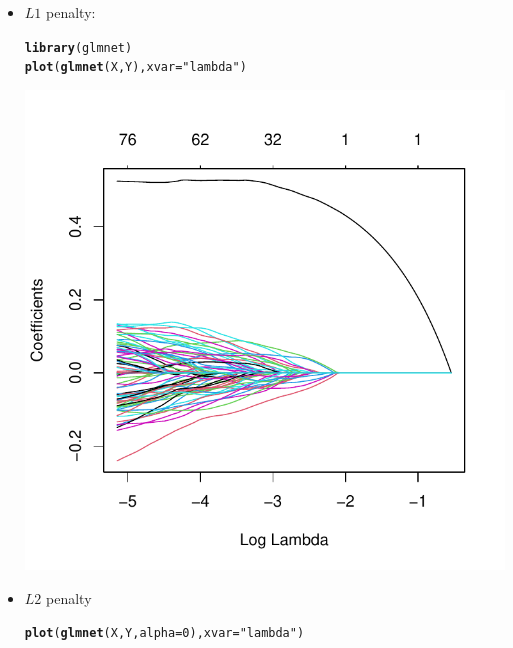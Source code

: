 \documentclass[a4paper]{article}
\makeatletter
\def\maxwidth{ %
  \ifdim\Gin@nat@width>\linewidth
    \linewidth
  \else
    \Gin@nat@width
  \fi
}
\newcommand{\hlnum}[1]{\textcolor[rgb]{0.686,0.059,0.569}{#1}}%
\newcommand{\hlstr}[1]{\textcolor[rgb]{0.192,0.494,0.8}{#1}}%
\newcommand{\hlstd}[1]{\textcolor[rgb]{0.345,0.345,0.345}{#1}}%
\newcommand{\hlkwc}[1]{\textcolor[rgb]{0.333,0.667,0.333}{#1}}%
\newcommand{\hlkwd}[1]{\textcolor[rgb]{0.737,0.353,0.396}{\textbf{#1}}}%
\newenvironment{kframe}{%
 \def\at@end@of@kframe{}%
 \ifinner\ifhmode%
  \def\at@end@of@kframe{\end{minipage}}%
  \begin{minipage}{\columnwidth}%
 \fi\fi%
 \def\FrameCommand##1{\hskip\@totalleftmargin \hskip-\fboxsep
 \colorbox{shadecolor}{##1}\hskip-\fboxsep
     \hskip-\linewidth \hskip-\@totalleftmargin \hskip\columnwidth}%
 \MakeFramed {\advance\hsize-\width
   \@totalleftmargin\z@ \linewidth\hsize
   \@setminipage}}%
 {\par\unskip\endMakeFramed%
 \at@end@of@kframe}
\newenvironment{knitrout}{}{} %
\makeatother
\begin{document}
{\begin{enumerate}
\begin{itemize}
\item $L1$ penalty:
\begin{knitrout}
\color{fgcolor}\begin{kframe}
\begin{alltt}
\hlkwd{library}\hlstd{(glmnet)}
\hlkwd{plot}\hlstd{(}\hlkwd{glmnet}\hlstd{(X, Y),} \hlkwc{xvar} \hlstd{=} \hlstr{"lambda"}\hlstd{)}
\end{alltt}
\end{kframe}
\includegraphics[width=\maxwidth]{figure/unnamed-chunk-5-1} 
\end{knitrout}
\item $L2$ penalty
\begin{knitrout}
\color{fgcolor}\begin{kframe}
\begin{alltt}
\hlkwd{plot}\hlstd{(}\hlkwd{glmnet}\hlstd{(X, Y,} \hlkwc{alpha} \hlstd{=} \hlnum{0}\hlstd{),} \hlkwc{xvar} \hlstd{=} \hlstr{"lambda"}\hlstd{)}
\end{alltt}
\end{kframe}

\end{knitrout}
\end{itemize}
\end{enumerate}}
\end{document}
